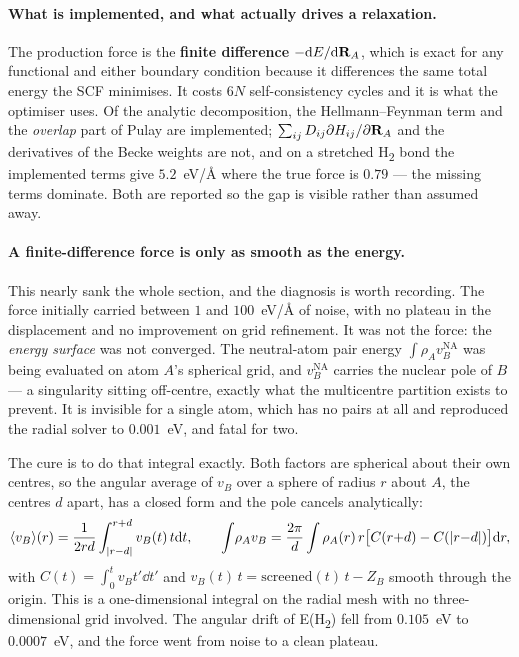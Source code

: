 \documentclass[11pt,a4paper]{article}
\begin{document}
\paragraph{What is implemented, and what actually drives a relaxation.}
The production force is the \textbf{finite difference} $-\dd E/\dd\vb{R}_A$,
which is exact for any functional and either boundary condition because it
differences the same total energy the SCF minimises. It costs $6N$
self-consistency cycles and it is what the optimiser uses. Of the analytic
decomposition, the Hellmann--Feynman term and the \emph{overlap} part of Pulay
are implemented; $\sum_{ij}D_{ij}\partial H_{ij}/\partial\vb{R}_A$ and the
derivatives of the Becke weights are not, and on a stretched H\textsubscript{2}
bond the implemented terms give $5.2$~eV/\AA{} where the true force is $0.79$
--- the missing terms dominate. Both are reported so the gap is visible rather
than assumed away.

\paragraph{A finite-difference force is only as smooth as the energy.}
This nearly sank the whole section, and the diagnosis is worth recording. The
force initially carried between $1$ and $100$~eV/\AA{} of noise, with no
plateau in the displacement and no improvement on grid refinement. It was not
the force: the \emph{energy surface} was not converged. The neutral-atom pair
energy $\int\rho_A v_B^{\text{NA}}$ was being evaluated on atom $A$'s spherical
grid, and $v_B^{\text{NA}}$ carries the nuclear pole of $B$ --- a singularity
sitting off-centre, exactly what the multicentre partition exists to prevent.
It is invisible for a single atom, which has no pairs at all and reproduced the
radial solver to $0.001$~eV, and fatal for two.

The cure is to do that integral exactly. Both factors are spherical about
their own centres, so the angular average of $v_B$ over a sphere of radius $r$
about $A$, the centres $d$ apart, has a closed form and the pole cancels
analytically:
\begin{equation}
  \langle v_B\rangle(r) = \frac{1}{2rd}\int_{\abs{r-d}}^{r+d} v_B(t)\,t\dd t,
  \qquad
  \int\!\rho_A v_B = \frac{2\pi}{d}\int \rho_A(r)\,r
     \bigl[C(r{+}d) - C(\abs{r{-}d})\bigr]\dd r ,
\end{equation}
with $C(t) = \int_0^t v_B t'\dd t'$ and
$v_B(t)\,t = \text{screened}(t)\,t - Z_B$ smooth through the origin. This is a
one-dimensional integral on the radial mesh with no three-dimensional grid
involved. The angular drift of E(H\textsubscript{2}) fell from $0.105$~eV to
$0.0007$~eV, and the force went from noise to a clean plateau.
\end{document}
